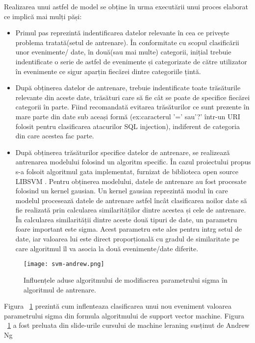 Realizarea unui astfel de model se obține în urma executării unui proces elaborat ce implică mai mulți păși: 
\begin{itemize}
	\item  Primul pas reprezintă indentificarea datelor relevante în cea ce privește problema tratată(setul de antrenare). În conformitate cu scopul clasificării unor evenimente/ date, în două(sau mai multe) categorii, inițial trebuie indentificate o serie de astfel de evenimente și categorizate de către utilizator în evenimente ce sigur aparțin fiecărei dintre categoriile țintă. 
	\item  După  obținerea datelor de antrenare, trebuie indentificate toate trăsăturile relevante din aceste date, trăsături care să fie cât se poate de specifice fiecărei categorii în parte. Fiind recomandată evitarea trăsăturilor ce sunt prezente în mare parte din date sub aceași formă (ex:caracterul '=' sau'?' într-un URI folosit pentru clasificarea atacurilor SQL injection), indiferent de categoria din care acestea fac parte. 
	\item  După obținerea trăsăturilor specifice datelor de antrenare, se realizează antrenarea modelului folosind un algoritm specific. În cazul proiectului propus s-a folsoit algoritmul gata implementat, furnizat de biblioteca open source LIBSVM  \cite{libsvm}.  Pentru obținerea modelului, datele de antrenare au fost procesate folosind un kernel gausian. Un kernel gausian reprezintă modul în care modelul procesează datele de antrenare astfel încât clasificarea noilor date să fie realizată prin calcularea similarităților dintre acestea și cele de antrenare. În calcularea similarității dintre aceste două tipuri de date, un parametru foare important este sigma. Acest parametru este ales pentru intrg setul de date, iar valoarea lui este direct proporțională cu gradul de similaritate pe care algoritmul îl va asocia la două evenimente/date diferite. 
\end{itemize}



\begin{figure}[h]
	\centering
	\texttt{[image: svm-andrew.png]}
	\caption{ Influențele aduse algoritmului de modifiacrea parametrului sigma în algoritmul de antrenare. }
	\label{fig:rev-proxy}
\end{figure}


Figura ~\ref{fig:rev-proxy} prezintă cum inflenteaza clasificarea unui nou eveniment valoarea parametrului sigma din formula algoritmului de support vector machine.  Figura ~\ref{fig:rev-proxy} a fost preluata din slide-urile cursului de machine leraning susținut de Andrew Ng \cite{andrew_ng} \\


